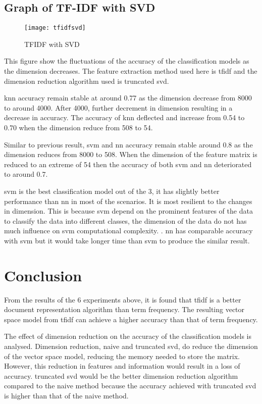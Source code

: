 \subsection{Graph of TF-IDF with SVD}
\begin{figure} [ht]
	\centering
	\texttt{[image: tfidfsvd]}
	\caption{TFIDF with SVD}
	\label{fig:tfidfSVD}
\end{figure}

This figure show the fluctuations of the accuracy of the classification models as the dimension decreases. The feature extraction method used here is \ac{tfidf} and the dimension reduction algorithm used is truncated \ac{svd}.

\Ac{knn} accuracy remain stable at around 0.77 as the dimension decrease from 8000 to around 4000. After 4000, further decrement in dimension resulting in a decrease in accuracy. The accuracy of \ac{knn} deflected and increase from 0.54 to 0.70 when the dimension reduce from 508 to 54.

Similar to previous result, \ac{svm} and \ac{nn} accuracy remain stable around 0.8 as the dimension reduces from 8000 to 508. When the dimension of the feature matrix is reduced to an extreme of 54 then the accuracy of both \ac{svm} and \ac{nn} deteriorated to around 0.7.

\Ac{svm} is the best classification model out of the 3, it has slightly better performance than \ac{nn} in most of the scenarios. It is most resilient to the changes in dimension. This is because \ac{svm} depend on the prominent features of the data to classify the data into different classes, the dimension of the data do not has much influence on \ac{svm} computational complexity. \cite{dimRedCat}. \Ac{nn} has comparable accuracy with \ac{svm} but it would take longer time than \ac{svm} to produce the similar result.


\section{Conclusion}
From the results of the 6 experiments above, it is found that \ac{tfidf} is a better document representation algorithm than term frequency. The resulting vector space model from \ac{tfidf} can achieve a higher accuracy than that of term frequency. 

The effect of dimension reduction on the accuracy of the classification models is analysed. Dimension reduction, naive and truncated \ac{svd}, do reduce the dimension of the vector space model, reducing the memory needed to store the matrix. However, this reduction in features and information would result in a loss of accuracy. truncated \ac{svd} would be the better dimension reduction algorithm compared to the naive method because the accuracy achieved with truncated \ac{svd} is higher than that of the naive method.

